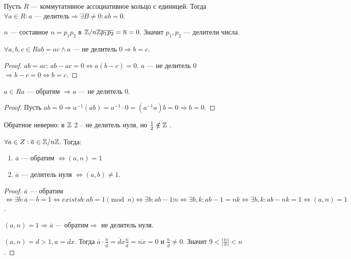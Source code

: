 \begin{definition}
    Пусть $R$ --- коммутативное ассоциативное кольцо с единицей. Тогда  $\forall a \in R: a\text{ --- делитель} \Rightarrow \exists B \neq 0: ab = 0$.
\end{definition}
\begin{example}
    $n$ --- составное  $n=p_1p_2$ в $\mathbb{Z} / n\mathbb{Z} \overline{p_1} \overline{p_2}=\overline{n}=0$. Значит $p_1,p_2$ --- делители числа.
\end{example}
\begin{lemma}
    $\forall a, b, c \in R ab = ac \land a\text{ --- не делитель 0} \Rightarrow b = c$. 
\end{lemma}
\begin{proof}
    $ab=ac$:  $ab - ac = 0 \iff a(b-c) = 0$.  $a$ --- не делитель 0  $\Rightarrow b-c=0 \iff b = c$.
\end{proof}
\begin{lemma}
    $a \in R a$ --- обратим $\Rightarrow a$ --- не делитель 0.
\end{lemma}
\begin{proof}
    Пусть $ab=0 \Rightarrow a^{-1}(ab) = a^{-1} \cdot 0 = (a^{-1}a)b = 0 \Rightarrow b =0$.
\end{proof}
\begin{remark}
    Обратное неверно: в $\mathbb{Z}$ 2 -- не делитель нуля, но  $\frac{1}{2} \notin \mathbb{Z}$ .
\end{remark}
\begin{theorem}
    $\forall a \in Z: \overline{a} \in \mathbb{Z} / n\mathbb{Z}$. Тогда:  
    \begin{enumerate}
        \item $\overline{a}$ --- обратим $\iff (a, n) = 1$
        \item  $\overline{a}$ --- делитель нуля $\iff (a, b) \neq 1$.
    \end{enumerate}
\end{theorem}
\begin{proof}
    $\overline{a}$ --- обратим  $\iff \exists \overline{b}: \overline{a} - \overline{b} = \overline{1} \iff exists b: ab = 1 \pmod{n} \iff \exists b: ab - 1 \vdots n \iff \exists b, k: ab-1=nk \iff \exists b, k: ab-nk=1 \iff (a,n)  = 1$.

    $(a, n) = 1 \Rightarrow \overline{a}\text{ --- обратим} \Rightarrow$ не делитель нуля.

    $(a, n) = d > 1, a = dx$. Тогда  $\overline{a} \cdot \frac{\overline{n}}{\overline{d}} = \overline{d}x \frac{\overline{n}}{\overline{d}} = \overline{nx} = 0$ и $\frac{\overline{n}}{\overline{d}} \neq 0$. Значит  $9 < |\frac{n}{d}| < n$.
\end{proof}
